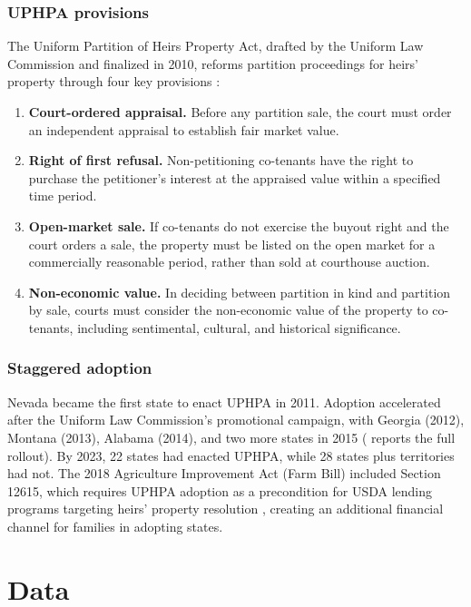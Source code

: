 \documentclass[12pt]{article}
\begin{document}
\subsubsection*{UPHPA provisions} The Uniform Partition of Heirs Property Act, drafted by the Uniform Law Commission and finalized in 2010, reforms partition proceedings for heirs' property through four key provisions \citep{ulc2010}:

\begin{enumerate}
\item \textbf{Court-ordered appraisal.} Before any partition sale, the court must order an independent appraisal to establish fair market value.
\item \textbf{Right of first refusal.} Non-petitioning co-tenants have the right to purchase the petitioner's interest at the appraised value within a specified time period.
\item \textbf{Open-market sale.} If co-tenants do not exercise the buyout right and the court orders a sale, the property must be listed on the open market for a commercially reasonable period, rather than sold at courthouse auction.
\item \textbf{Non-economic value.} In deciding between partition in kind and partition by sale, courts must consider the non-economic value of the property to co-tenants, including sentimental, cultural, and historical significance.
\end{enumerate}

\subsubsection*{Staggered adoption} Nevada became the first state to enact UPHPA in 2011. Adoption accelerated after the Uniform Law Commission's promotional campaign, with Georgia (2012), Montana (2013), Alabama (2014), and two more states in 2015 ( reports the full rollout). By 2023, 22 states had enacted UPHPA, while 28 states plus territories had not. The 2018 Agriculture Improvement Act (Farm Bill) included Section 12615, which requires UPHPA adoption as a precondition for USDA lending programs targeting heirs' property resolution \citep{farmbill2018}, creating an additional financial channel for families in adopting states.

\section{Data}
\end{document}
